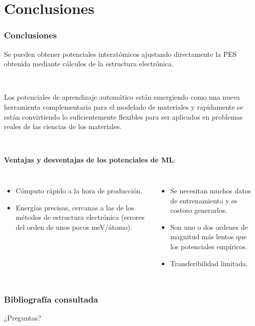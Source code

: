 \documentclass[aspectratio=169]{beamer}
\let\oldtextbf\textbf
\renewcommand{\textbf}[1]{\textcolor{nordblue}{\oldtextbf{#1}}}
\begin{document}
    \section{Conclusiones}

    \begin{frame}
        \frametitle{Conclusiones}

        Se pueden obtener potenciales interatómicos ajustando directamente la
        PES obtenida mediante cálculos de la estructura electrónica.
        
        \ \pause

        Los potenciales de aprendizaje automático están emergiendo como una nueva
        herramienta complementaria para el modelado de materiales y rapidamente 
        se están convirtiendo lo suficientemente flexibles para ser aplicados 
        en problemas reales de las ciencias de los materiales.


        \ \pause

        \textbf{Ventajas y desventajas de los potenciales de ML}:

        \pause 

        \begin{columns}
            \begin{itemize}
                \item Cómputo rápido a la hora de producción.
                \item Energías precisas, cercanas a las de los métodos de 
                    estructura electrónica (errores del orden de unos pocos 
                    meV/átomo).
            \end{itemize}

            \pause

            \begin{itemize}
                \item Se necesitan muchos datos de entrenamiento y es costoso 
                    generarlos.
                \item Son uno o dos ordenes de magnitud más lentos que los 
                    potenciales empíricos.
                \item Transferibilidad limitada. 
            \end{itemize}
        \end{columns}

    \end{frame}


    \begin{frame}
        \frametitle{Bibliografía consultada}
    \end{frame}
    
    
    \begin{frame}
        \begin{center}
            \huge{¿Preguntas?}
        \end{center}
    \end{frame}
\end{document}
